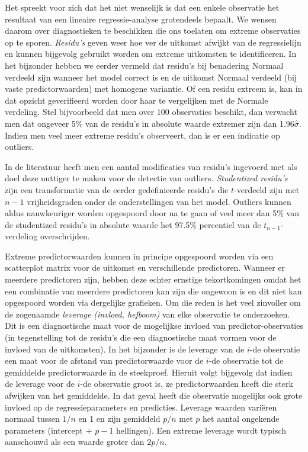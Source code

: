 \documentclass[
  dutch,
  letterpaper,
  12pt]{book}
\theoremstyle{definition}
\theoremstyle{definition}
\theoremstyle{definition}
\theoremstyle{remark}
\begin{document}
Het spreekt voor zich dat het niet wenselijk is dat een enkele
observatie het resultaat van een lineaire regressie-analyse grotendeels
bepaalt. We wensen daarom over diagnostieken te beschikken die ons
toelaten om extreme observaties op te sporen. \emph{Residu's} geven weer
hoe ver de uitkomst afwijkt van de regressielijn en kunnen bijgevolg
gebruikt worden om extreme uitkomsten te identificeren. In het bijzonder
hebben we eerder vermeld dat residu's bij benadering Normaal verdeeld
zijn wanneer het model correct is en de uitkomst Normaal verdeeld (bij
vaste predictorwaarden) met homogene variantie. Of een residu extreem
is, kan in dat opzicht geverifieerd worden door haar te vergelijken met
de Normale verdeling. Stel bijvoorbeeld dat men over 100 observaties
beschikt, dan verwacht men dat ongeveer 5\% van de residu's in absolute
waarde extremer zijn dan 1.96\(\hat{\sigma}\). Indien men veel meer
extreme residu's observeert, dan is er een indicatie op outliers.

In de literatuur heeft men een aantal modificaties van residu's
ingevoerd met als doel deze nuttiger te maken voor de detectie van
outliers. \emph{Studentized residu's} zijn een transformatie van de
eerder gedefinieerde residu's die \(t\)-verdeeld zijn met \(n-1\)
vrijheidsgraden onder de onderstellingen van het model. Outliers kunnen
aldus nauwkeuriger worden opgespoord door na te gaan of veel meer dan
5\% van de studentized residu's in absolute waarde het 97.5\% percentiel
van de \(t_{n-1}\)-verdeling overschrijden.

Extreme predictorwaarden kunnen in principe opgespoord worden via een
scatterplot matrix voor de uitkomst en verschillende predictoren.
Wanneer er meerdere predictoren zijn, hebben deze echter ernstige
tekortkomingen omdat het een combinatie van meerdere predictoren kan
zijn die ongewoon is en dit niet kan opgespoord worden via dergelijke
grafieken. Om die reden is het veel zinvoller om de zogenaamde
\emph{leverage (invloed, hefboom)} van elke observatie te onderzoeken.
Dit is een diagnostische maat voor de mogelijkse invloed van
predictor-observaties (in tegenstelling tot de residu's die een
diagnostische maat vormen voor de invloed van de uitkomsten). In het
bijzonder is de leverage van de \(i\)-de observatie een maat voor de
afstand van predictorwaarde voor de \(i\)-de observatie tot de
gemiddelde predictorwaarde in de steekproef. Hieruit volgt bijgevolg dat
indien de leverage voor de \(i\)-de observatie groot is, ze
predictorwaarden heeft die sterk afwijken van het gemiddelde. In dat
geval heeft die observatie mogelijks ook grote invloed op de
regressieparameters en predicties. Leverage waarden variëren normaal
tussen \(1/n\) en 1 en zijn gemiddeld \(p/n\) met \(p\) het aantal
ongekende parameters (intercept + \(p-1\) hellingen). Een extreme
leverage wordt typisch aanschouwd als een waarde groter dan \(2p/n\).
\end{document}

